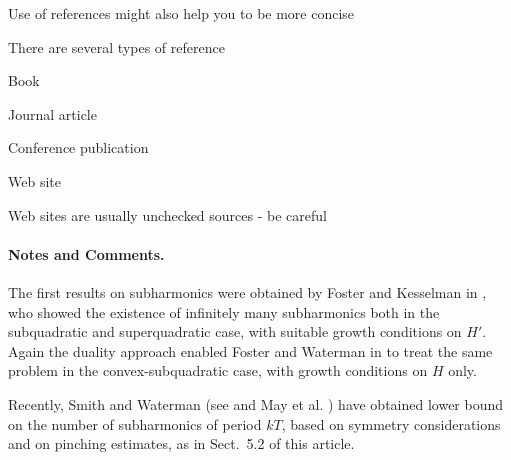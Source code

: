 \documentclass[lnicst,a4paper]{svmultln}
\begin{document}
Use of references might also help you to be more concise

There are several types of reference

Book

Journal article

Conference publication

Web site

Web sites are usually unchecked sources -
be careful





\paragraph{Notes and Comments.}
The first results on subharmonics were
obtained by Foster and Kesselman in \cite{fos:kes}, who showed the existence of
infinitely many subharmonics both in the subquadratic and superquadratic
case, with suitable growth conditions on $H'$. Again the duality
approach enabled Foster and Waterman in \cite{fos:kes:2} to treat the
same problem in the convex-subquadratic case, with growth conditions on
$H$ only.

Recently, Smith and Waterman (see \cite{smit:wat} and May et al. \cite{mes})
have obtained lower bound on the number of subharmonics of period $kT$,
based on symmetry considerations and on pinching estimates, as in
Sect.~5.2 of this article.




\end{document}
